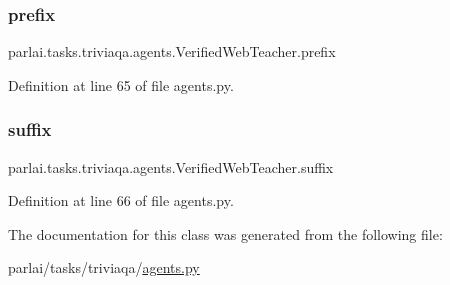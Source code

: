 \subsubsection{\texorpdfstring{prefix}{prefix}}
{\footnotesize\ttfamily parlai.\+tasks.\+triviaqa.\+agents.\+Verified\+Web\+Teacher.\+prefix}



Definition at line 65 of file agents.\+py.

\mbox{\label{classparlai_1_1tasks_1_1triviaqa_1_1agents_1_1VerifiedWebTeacher_a664ec91ac0757abaaf6853ea939232e4}} 
\subsubsection{\texorpdfstring{suffix}{suffix}}
{\footnotesize\ttfamily parlai.\+tasks.\+triviaqa.\+agents.\+Verified\+Web\+Teacher.\+suffix}



Definition at line 66 of file agents.\+py.



The documentation for this class was generated from the following file\+:\begin{DoxyCompactItemize}
\item 
parlai/tasks/triviaqa/\hyperlink{parlai_2tasks_2triviaqa_2agents_8py}{agents.\+py}\end{DoxyCompactItemize}
